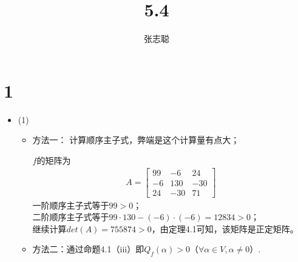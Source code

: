 \documentclass{article}
\begin{document}
\title{5.4}
\author{张志聪}
\maketitle

\section*{1}
\begin{itemize}
  \item (1)

        \begin{itemize}
          \item 方法一： 计算顺序主子式，弊端是这个计算量有点大；

                $f$的矩阵为
                \begin{align*}
                  A = \begin{bmatrix}
                        99 & -6  & 24  \\
                        -6 & 130 & -30 \\
                        24 & -30 & 71
                      \end{bmatrix}
                \end{align*}
                一阶顺序主子式等于$99 > 0$；\\
                二阶顺序主子式等于$99 \cdot 130 - (-6) \cdot (-6) = 12834 > 0$；\\
                继续计算$det(A) = 755874 > 0$，由定理4.1可知，该矩阵是正定矩阵。

          \item 方法二：通过命题4.1（iii）即$Q_f(\alpha) > 0$（$\forall \alpha \in V, \alpha \neq 0$）.


\end{itemize}
\end{itemize}
\end{document}
